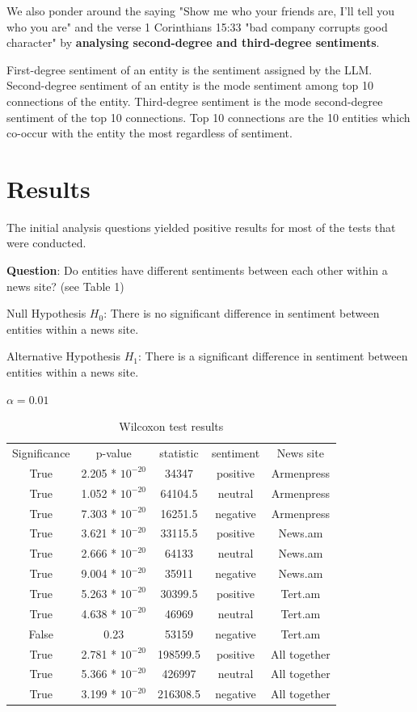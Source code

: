 \documentclass{IEEEtran}
\begin{document}
We also ponder around the saying "Show me who your friends are, I'll tell you who you are" and the verse 1 Corinthians 15:33 "bad company corrupts good character" by \textbf{analysing second-degree and third-degree sentiments}.

First-degree sentiment of an entity is the sentiment assigned by the LLM. Second-degree sentiment of an entity is the mode sentiment among top 10 connections of the entity. Third-degree sentiment is the mode second-degree sentiment of the top 10 connections. Top 10 connections are the 10 entities which co-occur with the entity the most regardless of sentiment.


\section{Results}

The initial analysis questions yielded positive results for most of the tests that were conducted. 
\newline

\textbf{Question}: Do entities have different sentiments between each other within a news site? (see Table 1) 

Null Hypothesis $H_0$: There is no significant difference in sentiment between entities within a news site.  

Alternative Hypothesis $H_1$: There is a significant difference in sentiment between entities within a news site.

$\alpha = 0.01$

\begin{table}
    \centering
    \begin{tabular}{ccccc}
        Significance & p-value & statistic & sentiment & News site \\
        True & 2.205 * $10^{-20}$ & 34347 & positive & Armenpress \\
        True & 1.052 * $10^{-20}$ & 64104.5 & neutral & Armenpress \\
        True & 7.303 * $10^{-20}$ & 16251.5 & negative & Armenpress \\
        True & 3.621 * $10^{-20}$ & 33115.5 & positive & News.am \\
        True & 2.666 * $10^{-20}$ & 64133 & neutral & News.am \\
        True & 9.004 * $10^{-20}$ & 35911 & negative & News.am \\
        True & 5.263 * $10^{-20}$ & 30399.5 & positive & Tert.am \\
        True & 4.638 * $10^{-20}$ & 46969 & neutral & Tert.am \\
        False & 0.23 & 53159 & negative & Tert.am \\
        True & 2.781 * $10^{-20}$ & 198599.5 & positive & All together \\
        True & 5.366 * $10^{-20}$ & 426997 & neutral & All together \\
        True & 3.199 * $10^{-20}$ & 216308.5 & negative & All together \\
    \end{tabular}
    \caption{Wilcoxon test results}
    \label{tab:wilcoxon}
\end{table}
\end{document}
